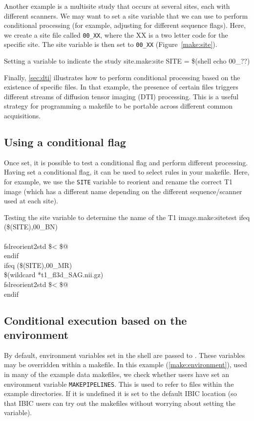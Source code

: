 Another example is a multisite study that occurs at several sites, each with different scanners. We may want to set a site variable that we can use to perform conditional processing (for example, adjusting for different sequence flags). Here, we create a site file called \texttt{00\_XX}, where the XX is a two letter code for the specific site. The site variable is then set to \texttt{00\_XX} (Figure~\ref{make:site}).

\begin{make}{Setting a variable to indicate the study site.}{make:site}
SITE = \$(shell echo 00\_??)
\end{make}

Finally, \autoref{sec:dti}  illustrates how to perform conditional processing based on the existence of specific files. In that example, the presence of certain files triggers different streams of diffusion tensor imaging (DTI) processing. This is a useful strategy for programming a makefile to be portable across different common acquisitions. 

\subsection{Using a conditional flag}
Once set, it is possible to test a conditional flag and perform different processing. Having set a conditional flag, it can be used to select rules in your makefile. Here, for example, we use the \texttt{SITE} variable to reorient and rename the correct T1 image (which has a different name depending on the different sequence/scanner used at each site). 

\begin{make}{Testing the site variable to determine the name of the T1 image.}{make:sitetest}
ifeq (\$(SITE),00\_BN) \\
\\
     \tab fslreorient2std \$< \$@    \\
endif \\

ifeq (\$(SITE),00_MR) \\
 {\$(wildcard *t1_fl3d_SAG.nii.gz)} \\
    \tab  fslreorient2std \$< \$@    \\
endif
\end{make}


\subsection{Conditional execution based on the environment}
By default, environment variables set in the shell are passed to \maken{}. These variables may be overridden within a makefile. In this example (\autoref{make:environment}), used in many of the example data makefiles, we check whether users have set an environment variable \texttt{MAKEPIPELINES}. This is used to refer to files within the example directories.  If it is undefined it is set to the default IBIC location (so that IBIC users can try out the makefiles without worrying about setting the variable).

